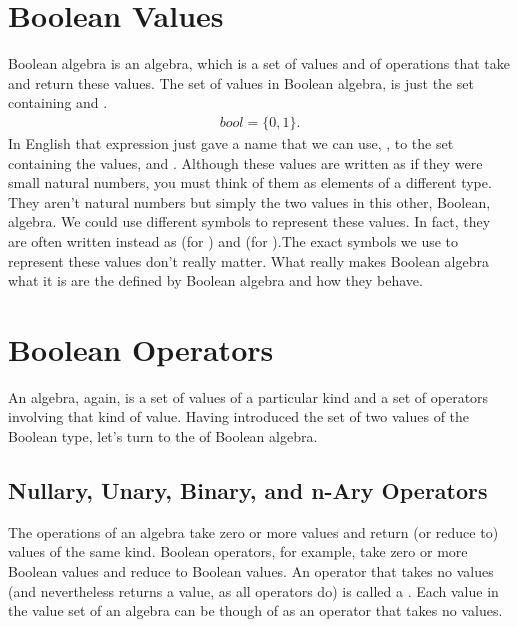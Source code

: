 \documentclass[letterpaper,10pt,english]{sphinxmanual}
\begin{document}
\section{Boolean Values}
\label{\detokenize{08-boolean-algebra:boolean-values}}
Boolean algebra is an algebra, which is a set of values and of
operations that take and return these values. The set of values in
Boolean algebra, is just the set containing  and .
\begin{equation*}
\begin{split}bool = \{ 0, 1 \}.\end{split}
\end{equation*}
In English that expression just gave a name that we can use, ,
to the set containing the values,  and . Although these values
are written as if they were small natural numbers, you must think of
them as elements of a different type. They aren’t natural numbers but
simply the two values in this other, Boolean, algebra. We could use
different symbols to represent these values. In fact, they are often
written instead as  (for ) and  (for ).The exact
symbols we use to represent these values don’t really matter. What
really makes Boolean algebra what it is are the  defined
by Boolean algebra and how they behave.


\section{Boolean Operators}
\label{\detokenize{08-boolean-algebra:boolean-operators}}
An algebra, again, is a set of values of a particular kind and a set
of operators involving that kind of value. Having introduced the set
of two values of the Boolean type, let’s turn to the  of
Boolean algebra.


\subsection{Nullary, Unary, Binary, and n-Ary Operators}
\label{\detokenize{08-boolean-algebra:nullary-unary-binary-and-n-ary-operators}}
The operations of an algebra take zero or more values and return (or
reduce to) values of the same kind. Boolean operators, for example,
take zero or more Boolean values and reduce to Boolean values. An
operator that takes no values (and nevertheless returns a value, as
all operators do) is called a . Each value in the value set
of an algebra can be though of as an operator that takes no values.
\end{document}
